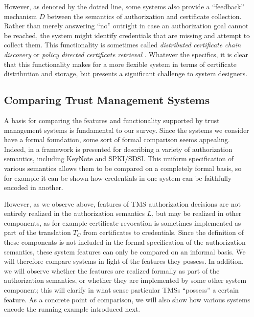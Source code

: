 However, as denoted by the dotted line, some systems also provide a
``feedback'' mechanism $D$ between the semantics of authorization and
certificate collection.  Rather than merely answering ``no'' outright
in case an authorization goal cannot be reached, the system might
identify credentials that are missing and attempt to collect them.
This functionality is sometimes called \emph{distributed certificate
chain discovery} \cite{Li:DCDTM} or \emph{policy directed certificate
retrieval} \cite{Gunter:PDCR}.
Whatever the specifics, it is clear that this functionality makes for
a more flexible system in terms of certificate distribution and
storage, but presents a significant challenge to system designers.

\subsection{Comparing Trust Management Systems}

A basis for comparing the features and functionality supported by
trust management systems is fundamental to our survey.  Since the
systems we consider have a formal foundation, some sort of formal
comparison seems appealing.  Indeed, in \cite{Weeks:UTMS} a framework
is presented for describing a variety of authorization semantics,
including KeyNote and SPKI/SDSI.  This uniform specification of
various semantics allows them to be compared on a completely formal
basis, so for example it can be shown how credentials in one system
can be faithfully encoded in another.

However, as we observe above, features of TMS authorization decisions
are not entirely realized in the authorization semantics $L$, but may
be realized in other components, as for example certificate revocation
is sometimes implemented as part of the translation $T_C$ from
certificates to credentials.  Since the definition of these components
is not included in the formal specification of the authorization
semantics, these system features can only be compared on an informal
basis.  We will therefore compare systems in light of the features
they possess.  In addition, we will observe whether the features are
realized formally as part of the authorization semantics, or whether
they are implemented by some other system component; this will clarify
in what sense particular TMSs ``possess'' a certain feature.  As a
concrete point of comparison, we will also show how various systems
encode the running example introduced next.  
 

